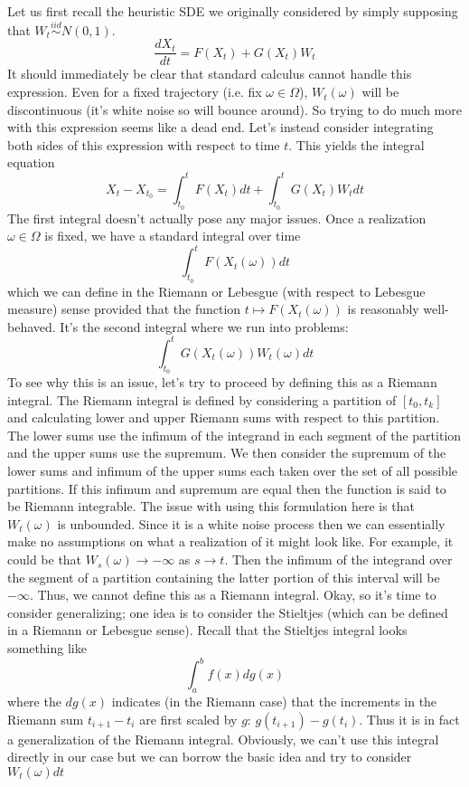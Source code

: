 \documentclass[12pt]{article}
\begin{document}
 Let us first recall the heuristic SDE we originally considered by simply supposing that $W_t \overset{iid}{\sim} N(0, 1)$. 
 \[\frac{dX_t}{dt} = F(X_t) + G(X_t) W_t\]
 It should immediately be clear that standard calculus cannot handle this expression. Even for a fixed trajectory (i.e. fix $\omega \in \Omega$), $W_t(\omega)$
 will be discontinuous (it's white noise so will bounce around). So trying to do much more with this expression seems like a dead end. Let's instead consider integrating
 both sides of this expression with respect to time $t$. This yields the integral equation
 \[X_t - X_{t_0} = \int_{t_0}^{t} F(X_t) dt + \int_{t_0}^{t} G(X_t) W_t dt\]
The first integral doesn't actually pose any major issues. Once a realization $\omega \in \Omega$ is fixed, we have a standard integral over time
\[\int_{t_0}^{t} F(X_t(\omega)) dt \]
which we can define in the Riemann or Lebesgue (with respect to Lebesgue measure) sense provided that the function $t \mapsto F(X_t(\omega))$ is reasonably well-behaved. 
It's the second integral where we run into problems:
\[\int_{t_0}^{t} G(X_t(\omega)) W_t(\omega) dt\]
To see why this is an issue, let's try to proceed by defining this as a Riemann integral. The Riemann integral is defined by considering a partition of $[t_0, t_k]$ and calculating
lower and upper Riemann sums with respect to this partition. The lower sums use the infimum of the integrand in each segment of the partition and the upper sums use 
the supremum. We then consider the supremum of the lower sums and infimum of the upper sums each taken over the set of all possible partitions. If this infimum and 
supremum are equal then the function is said to be Riemann integrable. The issue with using this formulation here is that $W_t(\omega)$ is unbounded. Since it is 
a white noise process then we can essentially make no assumptions on what a realization of it might look like. For example, it could be that $W_s(\omega) \to -\infty$
as $s \to t$. Then the infimum of the integrand over the segment of a partition containing the latter portion of this interval will be $-\infty$. Thus, we cannot define this 
as a Riemann integral. Okay, so it's time to consider generalizing; one idea is to consider the Stieltjes (which can be defined in a Riemann or Lebesgue sense). Recall 
that the Stieltjes integral looks something like 
\[\int_{a}^{b} f(x) dg(x)\]
where the $dg(x)$ indicates (in the Riemann case) that the increments in the Riemann sum $t_{i + 1} - t_i$ are first scaled by $g$: $g(t_{i + 1}) - g(t_i)$. Thus it is in fact 
a generalization of the Riemann integral. Obviously, we can't use this integral directly in our case but we can borrow the basic idea and try to consider $W_t(\omega) dt$ 
\end{document}
